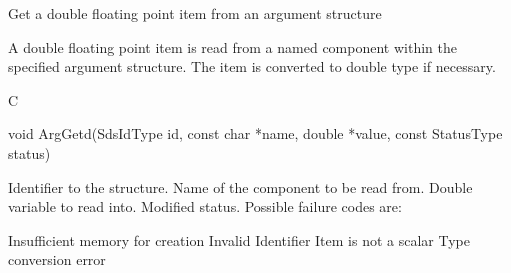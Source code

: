 \begin{manroutinedescription}
      Get a double floating point item from an argument structure

      A double floating point item is read from a named component within the
      specified argument structure. The item is converted to double
      type if necessary.
 
      C

      void ArgGetd(SdsIdType id, const char *name, double *value, const %
StatusType {\mantt{*}} status)
 
\begin{manparametertable}
 Identifier to the structure.
 Name of the component to be read %
from.
 Double variable to read into.
 Modified status. Possible %
failure codes are:
\end{manparametertable}
\begin{mantwocolumntable}
Insufficient memory for creation
Invalid Identifier
Item is not a scalar
Type conversion error
\end{mantwocolumntable}
\end{manroutinedescription}
